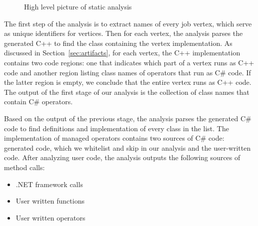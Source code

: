 \begin{figure}[ht]


\caption{High level picture of static analysis}
\label{fig:analysis}
\end{figure}

The first step of the analysis is to extract names of every job vertex, which serve as unique identifiers for vertices. Then for each vertex, the analysis parses the generated C++ to find the class containing the vertex implementation. As discussed in Section~\ref{sec:artifacts}, for each vertex, the C++ implementation contains two code regions: one that indicates which part of a vertex runs as C++ code and another region listing class names of operators that run as C\# code. If the latter region is empty, we conclude that the entire vertex runs as C++ code. The output of the first stage of our analysis is the collection of class names that contain C\# operators.

Based on the output of the previous stage, the analysis parses the generated C\# code to find definitions and implementation of every class in the list. The implementation of managed operators contains two sources of C\# code: generated code, which we whitelist and skip in our analysis and the user-written code. After analyzing user code, the analysis outputs the following sources of method calls:
\begin{itemize}
\item .NET framework calls
\item User written functions
\item User written operators 
\end{itemize}

